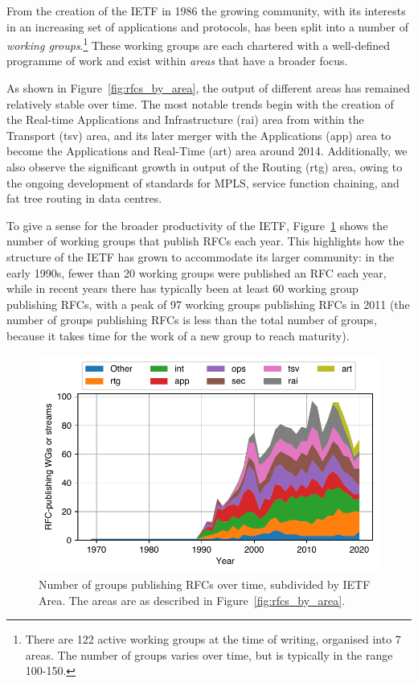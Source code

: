\documentclass[twocolumn,10pt]{article}
\newlength{\figureWidthOneColumn}
\newcommand{\pb}[1]{\vspace{0.75ex}\noindent{\textbf{#1}}}
\begin{document}
\pb{Role of Working Groups:}
From the creation of the IETF in 1986 the growing community, with its
interests in an increasing set of applications and protocols, has been
split into a number of \emph{working groups}.\footnote{There are 122
active working groups at the time of writing, organised into 7 areas.
The number of groups varies over time, but is typically in the range
100-150.} These working groups are each chartered with a well-defined
programme of work and exist within \emph{areas} that have a broader focus.  

As shown in Figure~\ref{fig:rfcs_by_area}, the output of
different areas has remained relatively stable over time. The most notable
trends begin with the creation of the Real-time Applications and
Infrastructure (rai) area from within the Transport (tsv) area, and its
later merger with the Applications (app) area to become the Applications
and Real-Time (art) area around 2014. Additionally, we also observe the
significant growth in output of the Routing (rtg) area, owing to the
ongoing development of standards for MPLS, service function chaining, and
fat tree routing in data centres.

To give a sense for the broader productivity of the IETF,
Figure~\ref{fig:pub_wgs_yearly} shows the number of working groups that
publish RFCs each year. This highlights how the structure of the IETF has
grown to accommodate its larger community: in the early 1990s, fewer than
20 working groups were published an RFC each year, while in recent years
there has typically been at least 60 working group publishing RFCs, with
a peak of 97 working groups publishing RFCs in 2011 (the number of groups
publishing RFCs is less than the total number of groups, because it takes
time for the work of a new group to reach maturity).

\begin{figure}
  \centering
  \includegraphics[width=\figureWidthOneColumn]{figures-prev/imc-2021/documents/unique_wgs_per_year_areas.pdf}
  \caption{
    Number of groups publishing RFCs over time, subdivided by IETF Area.
    The areas are as described in Figure~\ref{fig:rfcs_by_area}.
  }
  \label{fig:pub_wgs_yearly}
\end{figure}
\end{document}
